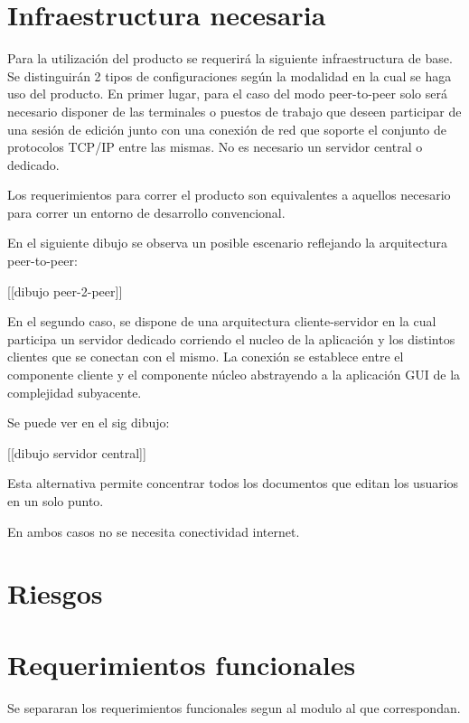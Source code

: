\documentclass[12pt,a4paper]{article}
\begin{document}
	
	\section{Infraestructura necesaria}

Para la utilización del producto se requerirá la siguiente infraestructura de base.
Se distinguirán 2 tipos de configuraciones según la modalidad en la cual se haga uso del producto.
En primer lugar, para el caso del modo peer-to-peer solo será necesario disponer de las terminales o puestos de trabajo que deseen participar de una sesión de edición junto con una conexión de red que soporte el conjunto de protocolos TCP/IP entre las mismas. No es necesario un servidor central o dedicado.

Los requerimientos para correr el producto son equivalentes a aquellos necesario para correr un entorno de desarrollo convencional.

En el siguiente dibujo se observa un posible escenario reflejando la arquitectura peer-to-peer:

[[dibujo peer-2-peer]]


En el segundo caso, se dispone de una arquitectura cliente-servidor en la cual participa un servidor dedicado corriendo el nucleo de la aplicación y los distintos clientes que se conectan con el mismo. La conexión se establece entre el componente cliente y el componente núcleo abstrayendo a la aplicación GUI de la complejidad subyacente.

Se puede ver en el sig dibujo:

[[dibujo servidor central]]

Esta alternativa permite concentrar todos los documentos que editan los usuarios en un solo punto.

En ambos casos no se necesita conectividad internet.	
	
	\section{Riesgos}
	\section{Requerimientos funcionales}
	
	Se separaran los requerimientos funcionales segun al modulo al que correspondan.
\end{document}
